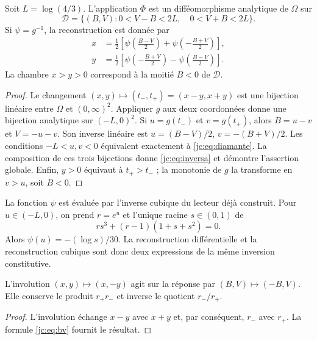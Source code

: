 \begin{theorem}
\label{jc:thm:global} Soit $L=\log(4/3)$. L’application $\Phi$ est un difféomorphisme analytique de $\Omega$ sur
\begin{equation}
\mathcal D=\{(B,V):0<V-B<2L,\quad0<V+B<2L\}.
\label{jc:eq:diamante}
\end{equation}
Si $\psi=g^{-1}$, la reconstruction est donnée par
\begin{align}
x&=\frac12\left[\psi\!\left(\frac{B-V}{2}\right)
                   +\psi\!\left(-\frac{B+V}{2}\right)\right],\\
y&=\frac12\left[\psi\!\left(-\frac{B+V}{2}\right)
                   -\psi\!\left(\frac{B-V}{2}\right)\right].
\label{jc:eq:inversa}
\end{align}
La chambre $x>y>0$ correspond à la moitié $B<0$ de $\mathcal D$.
\end{theorem}
\begin{proof}
Le changement $(x,y)\mapsto(t_-,t_+)=(x-y,x+y)$ est une bijection linéaire entre $\Omega$ et $(0,\infty)^2$. Appliquer $g$ aux deux coordonnées donne une bijection analytique sur $(-L,0)^2$. Si $u=g(t_-)$ et $v=g(t_+)$, alors $B=u-v$ et $V=-u-v$. Son inverse linéaire est $u=(B-V)/2$, $v=-(B+V)/2$. Les conditions $-L<u,v<0$ équivalent exactement à \eqref{jc:eq:diamante}. La composition de ces trois bijections donne \eqref{jc:eq:inversa} et démontre l’assertion globale. Enfin, $y>0$ équivaut à $t_+>t_-$ ; la monotonie de $g$ la transforme en $v>u$, soit $B<0$.
\end{proof}

La fonction $\psi$ est évaluée par l’inverse cubique du lecteur déjà construit. Pour $u\in(-L,0)$, on prend $r=e^u$ et l’unique racine $s\in(0,1)$ de
\[
rs^3+(r-1)(1+s+s^2)=0.
\]
Alors $\psi(u)=-(\log s)/30$. La reconstruction différentielle et la reconstruction cubique sont donc deux expressions de la même inversion constitutive.

\begin{corollary}
L’involution $(x,y)\mapsto(x,-y)$ agit sur la réponse par $(B,V)\mapsto(-B,V)$. Elle conserve le produit $r_+r_-$ et inverse le quotient $r_-/r_+$.
\end{corollary}
\begin{proof}
L’involution échange $x-y$ avec $x+y$ et, par conséquent, $r_-$ avec $r_+$. La formule \eqref{jc:eq:bv} fournit le résultat.
\end{proof}

